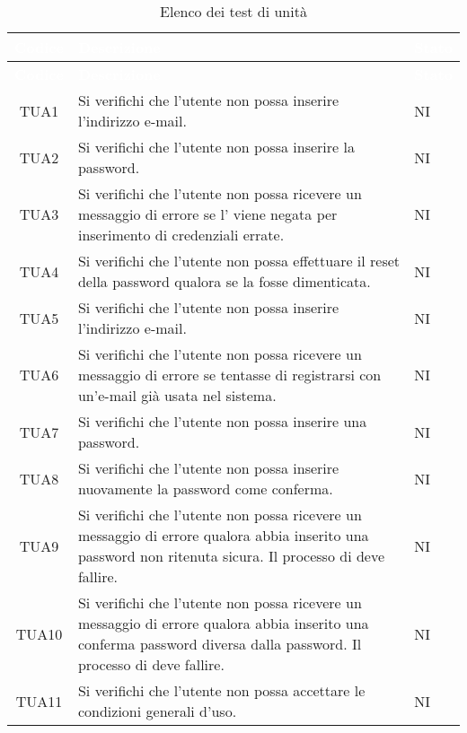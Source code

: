 {
\renewcommand{\arraystretch}{1.5}
\centering
\begin{longtable}{ c C{13cm} C{1cm}}
\caption{Elenco dei test di unità}\\
\textcolor{white}{\textbf{Codice}} & \textcolor{white}{\textbf{Descrizione}} & \textcolor{white}{\textbf{Stato}}\\
\endfirsthead
{}
\textcolor{white}{\textbf{Codice}} & \textcolor{white}{\textbf{Descrizione}} & \textcolor{white}{\textbf{Stato}}\\
\endhead

TUA1 & Si verifichi che l'utente non  possa inserire l'indirizzo e-mail. & NI \\
TUA2 & Si verifichi che l'utente non  possa inserire la password. & NI \\
TUA3 & Si verifichi che l'utente non  possa ricevere un messaggio di errore se l' viene negata per inserimento di credenziali errate. & NI \\
TUA4 & Si verifichi che l'utente non  possa effettuare il reset della password qualora se la fosse dimenticata. & NI \\
TUA5 & Si verifichi che l’utente non  possa inserire l'indirizzo e-mail. & NI \\
TUA6 & Si verifichi che l’utente non  possa ricevere un messaggio di errore se tentasse di registrarsi con un'e-mail già usata nel sistema.  & NI \\
TUA7 & Si verifichi che l’utente non  possa inserire una password. & NI \\
TUA8 & Si verifichi che l’utente non  possa inserire nuovamente la password come conferma. & NI \\
TUA9 & Si verifichi che l’utente non  possa ricevere un messaggio di errore qualora abbia inserito una password non ritenuta sicura. Il processo di  deve fallire. & NI \\
TUA10 & Si verifichi che l’utente non  possa ricevere un messaggio di errore qualora abbia inserito una conferma password diversa dalla password. Il processo di  deve fallire. & NI \\
TUA11 & Si verifichi che l’utente non  possa accettare le condizioni generali d'uso. & NI \\

\end{longtable}}
